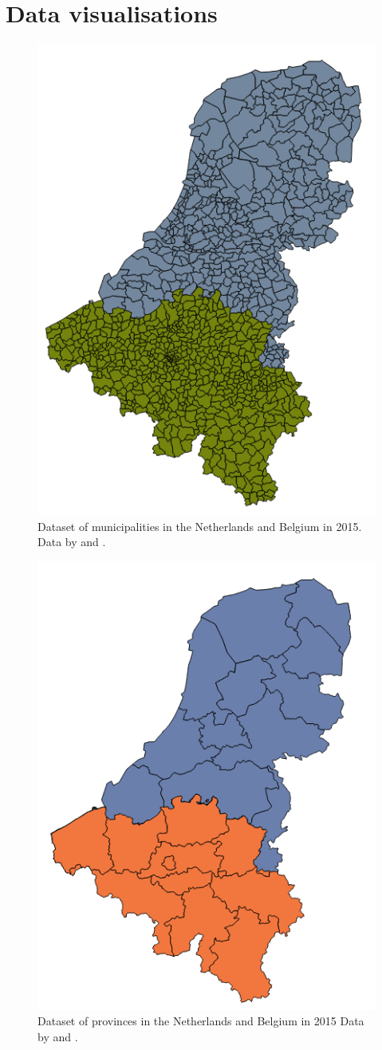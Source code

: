 
\chapter{Data visualisations}
\label{app:Data}

\begin{figure}[!h]
	\centering
	\includegraphics[width=0.5\linewidth]{figs/Municipalities.png}
	\caption{Dataset of municipalities in the Netherlands and Belgium in 2015. Data by \cite{DATA:Kadaster} and \cite{DATA:GADM}.}
	\label{fig:municipalities}
\end{figure}

\begin{figure}[!h]
	\centering
	\includegraphics[width=0.5\linewidth]{figs/Provinces.png}
	\caption{Dataset of provinces in the Netherlands and Belgium in 2015 Data by \cite{DATA:Kadaster} and \cite{DATA:GADM}.}
	\label{fig:provinces}
\end{figure}

